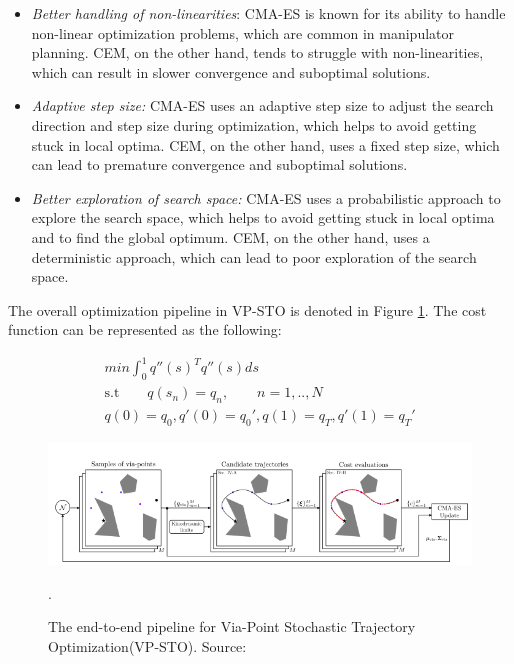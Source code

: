 \begin{itemize}
    \item \textit{Better handling of non-linearities}: CMA-ES is known for its ability to handle non-linear optimization problems, which are common in manipulator planning. CEM, on the other hand, tends to struggle with non-linearities, which can result in slower convergence and suboptimal solutions.
    \item \textit{Adaptive step size:} CMA-ES uses an adaptive step size to adjust the search direction and step size during optimization, which helps to avoid getting stuck in local optima. CEM, on the other hand, uses a fixed step size, which can lead to premature convergence and suboptimal solutions.
    \item \textit{Better exploration of search space:}  CMA-ES uses a probabilistic approach to explore the search space, which helps to avoid getting stuck in local optima and to find the global optimum. CEM, on the other hand, uses a deterministic approach, which can lead to poor exploration of the search space.
\end{itemize}

The overall optimization pipeline in VP-STO is denoted in Figure {\ref{fig:VP-STO}}. The cost function can be represented as the following:

\begin{subequations}
\begin{align}
    min \int_{0}^{1}q''(s)^Tq''(s)ds \\
    \text{s.t} \qquad q(s_n) = q_n, \qquad n = 1,..,N \\
    q(0) = q_0, q'(0) = q_0', q(1) = q_T, q'(1) = q_T'
\end{align}
\end{subequations}



\begin{figure}[ht]
    \centering
    \includegraphics[scale=0.5]{figures/bl-manipulator/VP-STO.png}
    \caption[The VP-STO pipeline]{The end-to-end pipeline for Via-Point Stochastic Trajectory Optimization(VP-STO). Source: \cite{VP-STO}}.
    \label{fig:VP-STO}
\end{figure}



